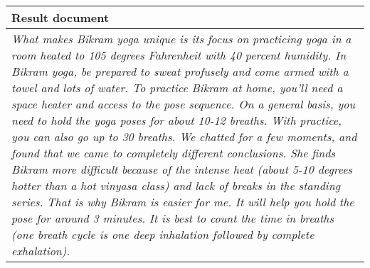 \documentclass{standalone}
\begin{document}
\begin{tabularx}{18cm}{X}
    \toprule
    \textbf{Result document}                                                                                                                                                                                                                                                                                                                                                                                                                                                                                                                                                                                                                                                                                                                                                                                                                                                                                                         \\
    \midrule
    \emph{What makes Bikram yoga unique is its focus on practicing yoga in a room heated to 105 degrees Fahrenheit with 40 percent humidity. In Bikram yoga, be prepared to sweat profusely and come armed with a towel and lots of water. To practice Bikram at home, you'll need a space heater and access to the pose sequence. On a general basis, you need to hold the yoga poses for about 10-12 breaths. With practice, you can also go up to 30 breaths. We chatted for a few moments, and found that we came to completely different conclusions. She finds Bikram more difficult because of the intense heat (about 5-10 degrees hotter than a hot vinyasa class) and lack of breaks in the standing series. That is why Bikram is easier for me. It will help you hold the pose for around 3 minutes. It is best to count the time in breaths (one breath cycle is one deep inhalation followed by complete exhalation).} \\
    \bottomrule
\end{tabularx}
\end{document}
